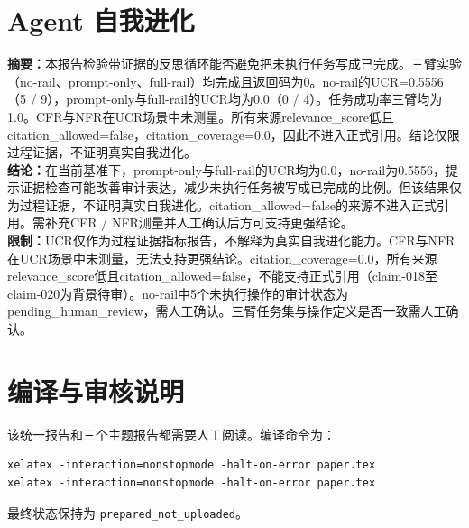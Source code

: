 \documentclass[UTF8]{ctexart}
\begin{document}
\section{Agent 自我进化}
\textbf{摘要：}本报告检验带证据的反思循环能否避免把未执行任务写成已完成。三臂实验（no-\allowbreak{}rail、prompt-\allowbreak{}only、full-\allowbreak{}rail）均完成且返回码为0。no-\allowbreak{}rail的UCR=0.5556（5 / 9），prompt-\allowbreak{}only与full-\allowbreak{}rail的UCR均为0.0（0 / 4）。任务成功率三臂均为1.0。CFR与NFR在UCR场景中未测量。所有来源relevance\_\allowbreak{}score低且citation\_\allowbreak{}allowed=false，citation\_\allowbreak{}coverage=0.0，因此不进入正式引用。结论仅限过程证据，不证明真实自我进化。\\
\textbf{结论：}在当前基准下，prompt-\allowbreak{}only与full-\allowbreak{}rail的UCR均为0.0，no-\allowbreak{}rail为0.5556，提示证据检查可能改善审计表达，减少未执行任务被写成已完成的比例。但该结果仅为过程证据，不证明真实自我进化。citation\_\allowbreak{}allowed=false的来源不进入正式引用。需补充CFR / NFR测量并人工确认后方可支持更强结论。\\
\textbf{限制：}UCR仅作为过程证据指标报告，不解释为真实自我进化能力。CFR与NFR在UCR场景中未测量，无法支持更强结论。citation\_\allowbreak{}coverage=0.0，所有来源relevance\_\allowbreak{}score低且citation\_\allowbreak{}allowed=false，不能支持正式引用（claim-\allowbreak{}018至claim-\allowbreak{}020为背景待审）。no-\allowbreak{}rail中5个未执行操作的审计状态为pending\_\allowbreak{}human\_\allowbreak{}review，需人工确认。三臂任务集与操作定义是否一致需人工确认。
\section{编译与审核说明}
该统一报告和三个主题报告都需要人工阅读。编译命令为：
\begin{verbatim}
xelatex -interaction=nonstopmode -halt-on-error paper.tex
xelatex -interaction=nonstopmode -halt-on-error paper.tex
\end{verbatim}
最终状态保持为 \texttt{prepared\_not\_uploaded}。
\end{document}
